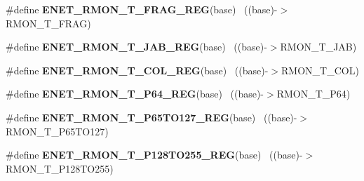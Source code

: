 \begin{DoxyCompactItemize}
\item 
\hypertarget{group___e_n_e_t___register___accessor___macros_gacfd04f9f8fdb6f473d482ab6248b9583}{}\#define {\bfseries E\+N\+E\+T\+\_\+\+R\+M\+O\+N\+\_\+\+T\+\_\+\+F\+R\+A\+G\+\_\+\+R\+E\+G}(base)                          ~((base)-\/$>$R\+M\+O\+N\+\_\+\+T\+\_\+\+F\+R\+A\+G)\label{group___e_n_e_t___register___accessor___macros_gacfd04f9f8fdb6f473d482ab6248b9583}

\item 
\hypertarget{group___e_n_e_t___register___accessor___macros_gacbbb156844cde4b598893c54ea0216bd}{}\#define {\bfseries E\+N\+E\+T\+\_\+\+R\+M\+O\+N\+\_\+\+T\+\_\+\+J\+A\+B\+\_\+\+R\+E\+G}(base)                            ~((base)-\/$>$R\+M\+O\+N\+\_\+\+T\+\_\+\+J\+A\+B)\label{group___e_n_e_t___register___accessor___macros_gacbbb156844cde4b598893c54ea0216bd}

\item 
\hypertarget{group___e_n_e_t___register___accessor___macros_ga2ac09b75eb7f73bf4f94614b7bb0c58c}{}\#define {\bfseries E\+N\+E\+T\+\_\+\+R\+M\+O\+N\+\_\+\+T\+\_\+\+C\+O\+L\+\_\+\+R\+E\+G}(base)                            ~((base)-\/$>$R\+M\+O\+N\+\_\+\+T\+\_\+\+C\+O\+L)\label{group___e_n_e_t___register___accessor___macros_ga2ac09b75eb7f73bf4f94614b7bb0c58c}

\item 
\hypertarget{group___e_n_e_t___register___accessor___macros_gae46f6476fec5f46048d50042b8128608}{}\#define {\bfseries E\+N\+E\+T\+\_\+\+R\+M\+O\+N\+\_\+\+T\+\_\+\+P64\+\_\+\+R\+E\+G}(base)                            ~((base)-\/$>$R\+M\+O\+N\+\_\+\+T\+\_\+\+P64)\label{group___e_n_e_t___register___accessor___macros_gae46f6476fec5f46048d50042b8128608}

\item 
\hypertarget{group___e_n_e_t___register___accessor___macros_gad4f6d3a3018a1aeec1b1ea51edf9dcf4}{}\#define {\bfseries E\+N\+E\+T\+\_\+\+R\+M\+O\+N\+\_\+\+T\+\_\+\+P65\+T\+O127\+\_\+\+R\+E\+G}(base)                  ~((base)-\/$>$R\+M\+O\+N\+\_\+\+T\+\_\+\+P65\+T\+O127)\label{group___e_n_e_t___register___accessor___macros_gad4f6d3a3018a1aeec1b1ea51edf9dcf4}

\item 
\hypertarget{group___e_n_e_t___register___accessor___macros_ga4b1a46a497cc35be7a3c26eb46b375f5}{}\#define {\bfseries E\+N\+E\+T\+\_\+\+R\+M\+O\+N\+\_\+\+T\+\_\+\+P128\+T\+O255\+\_\+\+R\+E\+G}(base)                ~((base)-\/$>$R\+M\+O\+N\+\_\+\+T\+\_\+\+P128\+T\+O255)\label{group___e_n_e_t___register___accessor___macros_ga4b1a46a497cc35be7a3c26eb46b375f5}


\end{DoxyCompactItemize}
